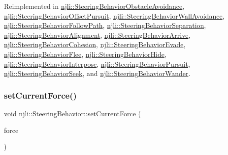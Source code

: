 Reimplemented in \mbox{\hyperlink{classnjli_1_1_steering_behavior_obstacle_avoidance_a24d56edf67f8dc605dcc7897f5ba87e8}{njli\+::\+Steering\+Behavior\+Obstacle\+Avoidance}}, \mbox{\hyperlink{classnjli_1_1_steering_behavior_offset_pursuit_a25cd6f2c3bbc1098c019477a27e836e3}{njli\+::\+Steering\+Behavior\+Offset\+Pursuit}}, \mbox{\hyperlink{classnjli_1_1_steering_behavior_wall_avoidance_a3a442f51bc80974e2ee203561370002a}{njli\+::\+Steering\+Behavior\+Wall\+Avoidance}}, \mbox{\hyperlink{classnjli_1_1_steering_behavior_follow_path_abf14bd10eee78a37827fabe77217e51d}{njli\+::\+Steering\+Behavior\+Follow\+Path}}, \mbox{\hyperlink{classnjli_1_1_steering_behavior_separation_ac784949adb0c8903b1c30fd89c92e5d1}{njli\+::\+Steering\+Behavior\+Separation}}, \mbox{\hyperlink{classnjli_1_1_steering_behavior_alignment_abdbf23a5b3b54642be4ff30ff0e3edca}{njli\+::\+Steering\+Behavior\+Alignment}}, \mbox{\hyperlink{classnjli_1_1_steering_behavior_arrive_af5a5fa8bcbc51a5e18a7c92f497a4251}{njli\+::\+Steering\+Behavior\+Arrive}}, \mbox{\hyperlink{classnjli_1_1_steering_behavior_cohesion_a548183e74a5af18a73001cbb787b318e}{njli\+::\+Steering\+Behavior\+Cohesion}}, \mbox{\hyperlink{classnjli_1_1_steering_behavior_evade_a8a2e13abe004302c0ef004cc034a2f6d}{njli\+::\+Steering\+Behavior\+Evade}}, \mbox{\hyperlink{classnjli_1_1_steering_behavior_flee_a9b960243fb690e3e7273c05bae18b55c}{njli\+::\+Steering\+Behavior\+Flee}}, \mbox{\hyperlink{classnjli_1_1_steering_behavior_hide_a6846cae09de6f06b52cc97a7ff0467f8}{njli\+::\+Steering\+Behavior\+Hide}}, \mbox{\hyperlink{classnjli_1_1_steering_behavior_interpose_acdbe12a685512be57fa5c01df5ef0769}{njli\+::\+Steering\+Behavior\+Interpose}}, \mbox{\hyperlink{classnjli_1_1_steering_behavior_pursuit_a10a5320c1971fc7ab685b996d5e39fa2}{njli\+::\+Steering\+Behavior\+Pursuit}}, \mbox{\hyperlink{classnjli_1_1_steering_behavior_seek_aa6b4f5010360d6a5d99177cd8ccae178}{njli\+::\+Steering\+Behavior\+Seek}}, and \mbox{\hyperlink{classnjli_1_1_steering_behavior_wander_af095b146581b167cfec14ef42bd2a32a}{njli\+::\+Steering\+Behavior\+Wander}}.

\mbox{\label{classnjli_1_1_steering_behavior_ad99f0f1056a0a980456e107bb3305fab}} 
\subsubsection{\texorpdfstring{set\+Current\+Force()}{setCurrentForce()}}
{\footnotesize\ttfamily \mbox{\hyperlink{_thread_8h_af1e856da2e658414cb2456cb6f7ebc66}{void}} njli\+::\+Steering\+Behavior\+::set\+Current\+Force (\begin{DoxyParamCaption}\item[{const bt\+Vector3 \&}]{force }\end{DoxyParamCaption})\hspace{0.3cm}{\ttfamily [protected]}}

